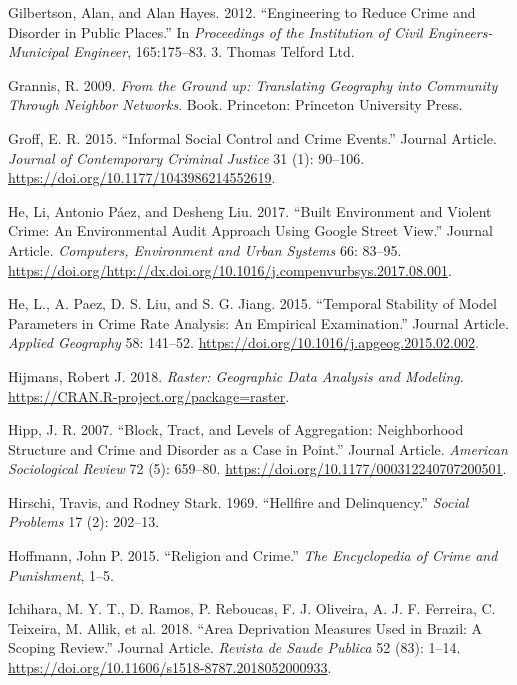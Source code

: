 \documentclass[smallextended]{svjour3}       %
\begin{document}
\leavevmode\hypertarget{ref-Gilbertson2012engineering}{}%
Gilbertson, Alan, and Alan Hayes. 2012. ``Engineering to Reduce Crime
and Disorder in Public Places.'' In \emph{Proceedings of the Institution
of Civil Engineers-Municipal Engineer}, 165:175--83. 3. Thomas Telford
Ltd.

\leavevmode\hypertarget{ref-Grannis2009from}{}%
Grannis, R. 2009. \emph{From the Ground up: Translating Geography into
Community Through Neighbor Networks}. Book. Princeton: Princeton
University Press.

\leavevmode\hypertarget{ref-Groff2015informal}{}%
Groff, E. R. 2015. ``Informal Social Control and Crime Events.'' Journal
Article. \emph{Journal of Contemporary Criminal Justice} 31 (1):
90--106. \url{https://doi.org/10.1177/1043986214552619}.

\leavevmode\hypertarget{ref-He2017built}{}%
He, Li, Antonio Páez, and Desheng Liu. 2017. ``Built Environment and
Violent Crime: An Environmental Audit Approach Using Google Street
View.'' Journal Article. \emph{Computers, Environment and Urban Systems}
66: 83--95.
\url{https://doi.org/http://dx.doi.org/10.1016/j.compenvurbsys.2017.08.001}.

\leavevmode\hypertarget{ref-He2015temporal}{}%
He, L., A. Paez, D. S. Liu, and S. G. Jiang. 2015. ``Temporal Stability
of Model Parameters in Crime Rate Analysis: An Empirical Examination.''
Journal Article. \emph{Applied Geography} 58: 141--52.
\url{https://doi.org/10.1016/j.apgeog.2015.02.002}.

\leavevmode\hypertarget{ref-Hijmans2018raster}{}%
Hijmans, Robert J. 2018. \emph{Raster: Geographic Data Analysis and
Modeling}. \url{https://CRAN.R-project.org/package=raster}.

\leavevmode\hypertarget{ref-Hipp2007block}{}%
Hipp, J. R. 2007. ``Block, Tract, and Levels of Aggregation:
Neighborhood Structure and Crime and Disorder as a Case in Point.''
Journal Article. \emph{American Sociological Review} 72 (5): 659--80.
\url{https://doi.org/10.1177/000312240707200501}.

\leavevmode\hypertarget{ref-Hirschi1969hellfire}{}%
Hirschi, Travis, and Rodney Stark. 1969. ``Hellfire and Delinquency.''
\emph{Social Problems} 17 (2): 202--13.

\leavevmode\hypertarget{ref-Hoffmann2015religion}{}%
Hoffmann, John P. 2015. ``Religion and Crime.'' \emph{The Encyclopedia
of Crime and Punishment}, 1--5.

\leavevmode\hypertarget{ref-Ichihara2018area}{}%
Ichihara, M. Y. T., D. Ramos, P. Reboucas, F. J. Oliveira, A. J. F.
Ferreira, C. Teixeira, M. Allik, et al. 2018. ``Area Deprivation
Measures Used in Brazil: A Scoping Review.'' Journal Article.
\emph{Revista de Saude Publica} 52 (83): 1--14.
\url{https://doi.org/10.11606/s1518-8787.2018052000933}.
\end{document}
